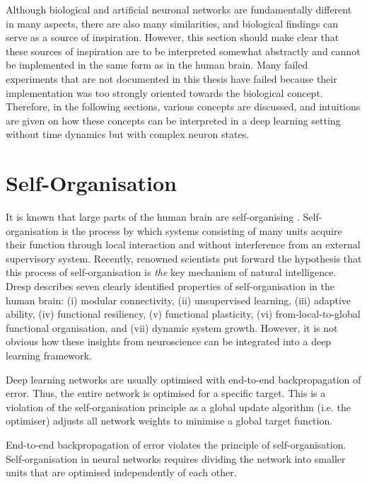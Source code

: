 Although biological and artificial neuronal networks are fundamentally different in many aspects, there are also many similarities, and biological findings can serve as a source of inspiration. However, this section should make clear that these sources of inspiration are to be interpreted somewhat abstractly and cannot be implemented in the same form as in the human brain. Many failed experiments that are not documented in this thesis have failed because their implementation was too strongly oriented towards the biological concept. Therefore, in the following sections, various concepts are discussed, and intuitions are given on how these concepts can be interpreted in a deep learning setting without time dynamics but with complex neuron states.

\section{Self-Organisation}
It is known that large parts of the human brain are self-organising .
Self-organisation is the process by which systems consisting of many units acquire their function through local interaction and without interference from an external supervisory system.
Recently, renowned scientists  put forward the hypothesis that this process of self-organisation is \emph{the} key mechanism of natural intelligence.
Dresp  describes seven clearly identified properties of self-organisation in the human brain: (i) modular connectivity, (ii) unsupervised learning, (iii) adaptive ability, (iv) functional resiliency, (v) functional plasticity, (vi) from-local-to-global functional organisation, and (vii) dynamic system growth.
However, it is not obvious how these insights from neuroscience can be integrated into a deep learning framework.

Deep learning networks are usually optimised with end-to-end backpropagation of error.
Thus, the entire network is optimised for a specific target.
This is a violation of the self-organisation principle as a global update algorithm (i.e. the optimiser) adjusts all network weights to minimise a global target function.


\begin{claim}
	End-to-end backpropagation of error violates the principle of self-organisation. Self-organisation in neural networks requires dividing the network into smaller units that are optimised independently of each other.
\end{claim}

